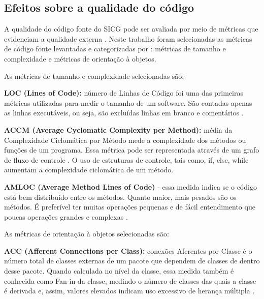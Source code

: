 \subsection[Efeitos sobre a qualidade do código]{Efeitos sobre a qualidade do código}

A qualidade do código fonte do SICG pode ser avaliada por meio de métricas que evidenciam a qualidade externa \cite{ISO25023}. Neste trabalho foram selecionadas as métricas de código fonte levantadas e categorizadas por : métricas de tamanho e complexidade e métricas de orientação à objetos. 

As métricas de tamanho e complexidade selecionadas são: 

\textbf{LOC (Lines of Code):} número de Linhas de Código foi uma das primeiras métricas
utilizadas para medir o tamanho de um software. São contadas apenas as linhas
executáveis, ou seja, são excluídas linhas em branco e comentários \cite{Jones91}.

 \vspace{\onelineskip} 

\textbf{ACCM (Average Cyclomatic Complexity per Method):} média da Complexidade
Ciclomática por Método mede a complexidade dos métodos ou funções
de um programa. Essa métrica pode ser representada através de um grafo de fluxo
de controle \cite{McCabe76}. O uso de estruturas de controle, tais como, if, else,
while aumentam a complexidade ciclomática de um método.

 \vspace{\onelineskip}

\textbf{AMLOC (Average Method Lines of Code)} - essa medida indica se o código está bem distribuído entre os métodos. Quanto maior, mais pesados são os métodos. É preferível ter muitas operações pequenas e de fácil entendimento que poucas operações grandes e complexas \cite{Meirelles2013}.



 \vspace{\onelineskip} 

As métricas de orientação à objetos selecionadas são:

\textbf{ACC (Afferent Connections per Class):} conexões Aferentes por Classe é o número
total de classes externas de um pacote que dependem de classes de dentro desse
pacote. Quando calculada no nível da classe, essa medida também é conhecida como
Fan-in da classe, medindo o número de classes das quais a classe é derivada e, assim,
valores elevados indicam uso excessivo de herança múltipla \cite{McCabe94} \cite{Chidamber94}.

